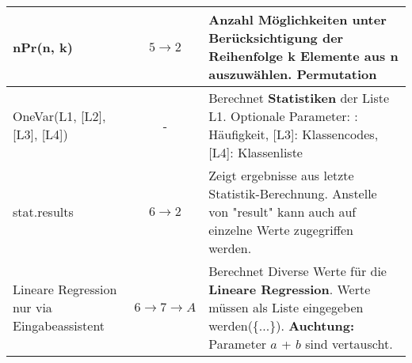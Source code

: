 \begin{tabular}{|p{5cm}|c|p{10cm}|}
    \hline
    nPr(n, k)                        & $5 \rightarrow 2$                & Anzahl Möglichkeiten unter Berücksichtigung der Reihenfolge
    \newline k Elemente aus n auszuwählen. \newline \textbf{Permutation}                                                                                                                                    \\
    \hline
    OneVar(L1, [L2], [L3], [L4])     & -                                & Berechnet \textbf{Statistiken} der Liste L1.
    \newline Optionale Parameter:
    \newline[L2]: Häufigkeit, [L3]: Klassencodes, [L4]: Klassenliste                                                                                                                               \\
    \hline
    stat.results                     & $6 \rightarrow 2$                & Zeigt ergebnisse aus letzte Statistik-Berechnung. Anstelle von "result" kann auch auf einzelne Werte zugegriffen werden. \\
    \hline
    Lineare Regression \newline
    {\tiny nur via Eingabeassistent} & $6 \rightarrow 7 \rightarrow A$  & Berechnet Diverse Werte für die \textbf{Lineare Regression}. Werte müssen als Liste eingegeben werden(\{...\}).
    \newline \textbf{Auchtung:} Parameter $a$ + $b$ sind vertauscht.                                                                                                                               \\
    \hline
\end{tabular}
